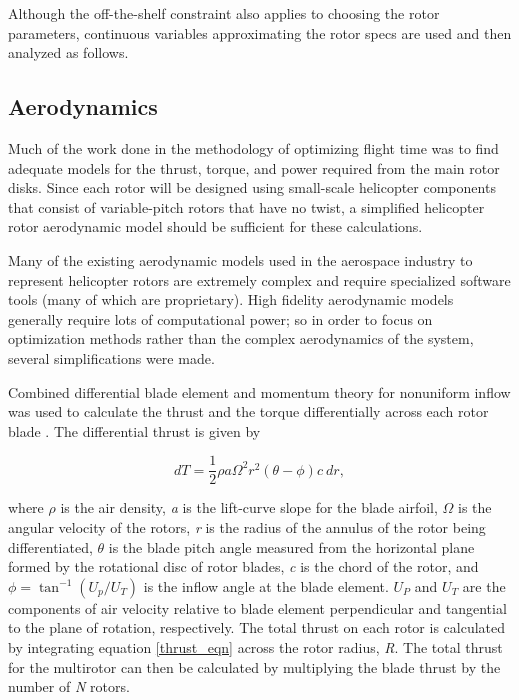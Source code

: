 \documentclass[letterpaper, 10 pt, conference]{ieeeconf}  %
\begin{document}
Although the off-the-shelf constraint also applies to choosing the rotor parameters, continuous variables approximating the rotor specs are used and then analyzed as follows. 

\subsection{Aerodynamics}

Much of the work done in the methodology of optimizing flight time was to find adequate models for the thrust, torque, and power required from the main rotor disks. Since each rotor will be designed using small-scale helicopter components that consist of variable-pitch rotors that have no twist, a simplified helicopter rotor aerodynamic model should be sufficient for these calculations. 

Many of the existing aerodynamic models used in the aerospace industry to represent helicopter rotors are extremely complex and require specialized software tools (many of which are proprietary). High fidelity aerodynamic models generally require lots of computational power; so in order to focus on optimization methods rather than the complex aerodynamics of the system, several simplifications were made.

Combined differential blade element and momentum theory for nonuniform inflow was used to calculate the thrust and the torque differentially across each rotor blade \cite{bramwell2001bramwell}. The differential thrust is given by

\begin{equation}
	dT = \frac{1}{2} \rho a \Omega^2 r^2 (\theta - \phi) c \  dr,
	\label{thrust_eqn}
\end{equation}

where $\rho$ is the air density, \textit{a} is the lift-curve slope for the blade airfoil, $\Omega$ is the angular velocity of the rotors, \textit{r} is the radius of the annulus of the rotor being differentiated, $\theta$ is the blade pitch angle measured from the horizontal plane formed by the rotational disc of rotor blades, \textit{c} is the chord of the rotor, and $\phi = \tan^{-1}(U_p/U_T) $ is the inflow angle at the blade element. $U_P$ and $U_T$ are the components of air velocity relative to blade element perpendicular and tangential to the plane of rotation, respectively. The total thrust on each rotor is calculated by integrating equation \ref{thrust_eqn} across the rotor radius, \textit{R}. The total thrust for the multirotor can then be calculated by multiplying the blade thrust by the number of \textit{N} rotors. 
\end{document}
